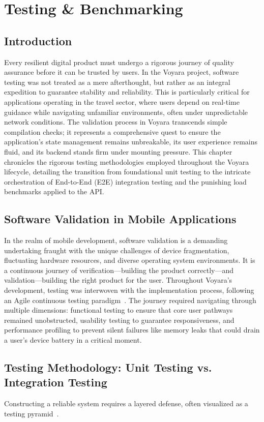 \chapter{Testing \& Benchmarking}

\section{Introduction}
Every resilient digital product must undergo a rigorous journey of quality assurance before it can be trusted by users. In the Voyara project, software testing was not treated as a mere afterthought, but rather as an integral expedition to guarantee stability and reliability. This is particularly critical for applications operating in the travel sector, where users depend on real-time guidance while navigating unfamiliar environments, often under unpredictable network conditions. The validation process in Voyara transcends simple compilation checks; it represents a comprehensive quest to ensure the application's state management remains unbreakable, its user experience remains fluid, and its backend stands firm under mounting pressure. This chapter chronicles the rigorous testing methodologies employed throughout the Voyara lifecycle, detailing the transition from foundational unit testing to the intricate orchestration of End-to-End (E2E) integration testing and the punishing load benchmarks applied to the API.

\section{Software Validation in Mobile Applications}
In the realm of mobile development, software validation is a demanding undertaking fraught with the unique challenges of device fragmentation, fluctuating hardware resources, and diverse operating system environments. It is a continuous journey of verification---building the product correctly---and validation---building the right product for the user. Throughout Voyara's development, testing was interwoven with the implementation process, following an Agile continuous testing paradigm~\cite{agile_testing}. The journey required navigating through multiple dimensions: functional testing to ensure that core user pathways remained unobstructed, usability testing to guarantee responsiveness, and performance profiling to prevent silent failures like memory leaks that could drain a user's device battery in a critical moment.

\section{Testing Methodology: Unit Testing vs. Integration Testing}
Constructing a reliable system requires a layered defense, often visualized as a testing pyramid~\cite{testing_pyramid}. 

